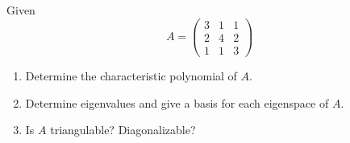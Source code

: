 \documentclass[12pt]{article}
\begin{document}
\section{}
Given 
\[
A = \begin{pmatrix}
3 & 1 & 1 \\
2 & 4 & 2 \\
1 & 1 & 3
\end{pmatrix}
\]

\begin{enumerate}
    \item Determine the characteristic polynomial of \( A \).
    \item Determine eigenvalues and give a basis for each eigenspace of \( A \).
    \item Is \( A \) triangulable? Diagonalizable?
\end{enumerate}
\end{document}
